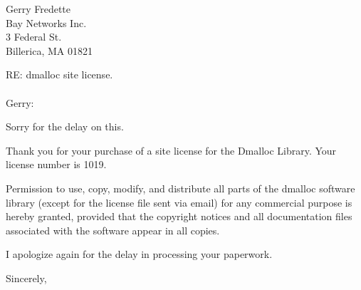 

%
%

%
%
\address{Dmalloc Software \\
826 Savannah Ave. \\
Pittsburgh, PA  15221-3446 \\
1.412.244.8827}

\signature{Gray Watson \\
gray@letters.com}

\date{February 17, 1998}


\begin{letter}{Gerry Fredette \\
Bay Networks Inc. \\
3 Federal St. \\
Billerica, MA  01821}

\opening{RE: dmalloc site license. \\
 \\
Gerry:}

Sorry for the delay on this.

Thank you for your 
purchase of a site license for the Dmalloc Library.  Your license number is
1019.

Permission to use, copy, modify, and distribute all parts of the
dmalloc software library (except for the license file sent via email)
for any commercial purpose is hereby granted, provided that the
copyright notices and all documentation files associated with the
software appear in all copies.

I apologize again for the delay in processing your paperwork.

\closing{Sincerely,}

\end{letter}

